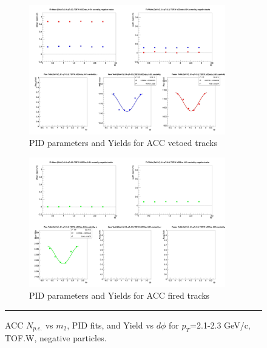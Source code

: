 \begin{figure}[H]
  \ContinuedFloat
    \begin{subfigure}{1\textwidth}
   \centering
   \includegraphics[width=0.94\textwidth]{hiptfits/neg/fitParams_tof2_cent0_ch0_pT-21-23.jpg}
    \caption{PID parameters and Yields for ACC vetoed tracks}
    \end{subfigure}    
    \begin{subfigure}{1\textwidth}
   \centering
   \includegraphics[width=0.94\textwidth]{hiptfits/neg/fitParams_tof3_cent0_ch0_pT-21-23.jpg}
    \caption{PID parameters and Yields for ACC fired tracks}
    \end{subfigure} 
    \rule{35em}{0.5pt}
  \caption[ACC $N_{p.e.}$ vs $m_2$, PID fits, and Yield vs $d\phi$ for $p_T$=2.1-2.3 GeV/c, TOF.W, negative particles.]{ACC $N_{p.e.}$ vs $m_2$, PID fits, and Yield vs $d\phi$ for $p_T$=2.1-2.3 GeV/c, TOF.W, negative particles.}
  \label{fig:acc21-23neg}
\end{figure}


